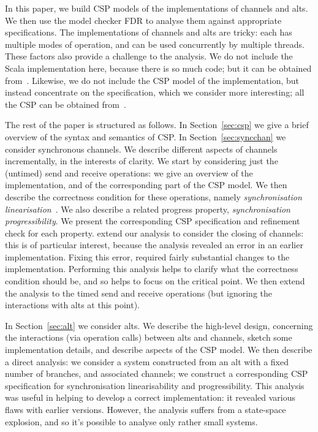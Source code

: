 In this paper, we build CSP models of the implementations of channels and
alts.  We then use the model checker FDR to analyse them against appropriate
specifications. 
%
The implementations of channels and alts are tricky: each has multiple modes
of operation, and can be used concurrently by multiple threads.  These factors
also provide a challenge to the analysis.
%
We do not include the Scala implementation here, because there is so much
code; but it can be obtained from~.  Likewise, we do not include
the CSP model of the implementation, but instead concentrate on the
specification, which we consider more interesting; all the CSP can be obtained
from~.

The rest of the paper is structured as follows.  In Section~\ref{sec:csp} we
give a brief overview of the syntax and semantics of CSP\@.  In
Section~\ref{sec:syncchan} we consider synchronous channels.  We describe
different aspects of channels incrementally, in the interests of clarity.  We
start by considering just the (untimed) send and receive operations: we give
an overview of the implementation, and of the corresponding part of the CSP
model.  We then describe the correctness condition for these operations,
namely \emph{synchronisation linearisation}~\cite{LL:synchronisation}.  We
also describe a related progress property, \emph{synchronisation
  progressibility}.  We present the corresponding CSP specification and
refinement check for each property.  extend our analysis to consider the
closing of channels: this is of particular interest, because the analysis
revealed an error in an earlier implementation.  Fixing this error, required
fairly substantial changes to the implementation.  Performing this analysis
helps to clarify what the correctness condition should be, and so helps to
focus on the critical point.  We then extend the analysis to the timed send
and receive operations (but ignoring the interactions with alts at this
point).

In Section~\ref{sec:alt} we consider alts.  We describe the high-level design,
concerning the interactions (via operation calls) between alts and channels,
sketch some implementation details, and describe aspects of the CSP model.  We
then describe a direct analysis: we consider a system constructed from an alt
with a fixed number of branches, and associated channels; we construct a
corresponding CSP specification for synchronisation linearisability and
progressibility.  This analysis was useful in helping to develop a correct
implementation: it revealed various flaws with earlier versions.  However, the
analysis suffers from a state-space explosion, and so it's possible to analyse
only rather small systems.

